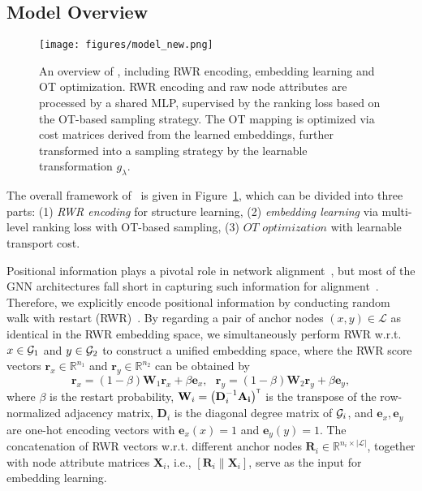 \vspace{-2pt}
\subsection{Model Overview}\label{subsec:overview}

\begin{figure}[t]
  \texttt{[image: figures/model\_new.png]}
  \caption{An overview of \algname, including RWR encoding, embedding learning and OT optimization. RWR encoding and raw node attributes are processed by a shared MLP, supervised by the ranking loss based on the OT-based sampling strategy. The OT mapping is optimized via cost matrices derived from the learned embeddings, further transformed into a sampling strategy by the learnable transformation $g_\lambda$.
  }
  \vspace{-10pt}
  \label{fig:model}
\end{figure}

The overall framework of \algname\ is given in Figure~\ref{fig:model}, which can be divided into three parts: (1) \textit{RWR encoding} for structure learning, (2) \textit{embedding learning} via multi-level ranking loss with OT-based sampling, (3) $\textit{OT optimization}$ with learnable transport cost.

Positional information plays a pivotal role in network alignment~\cite{bright,parrot}, but most of the GNN architectures fall short in capturing such information for alignment~\cite{you2019position}.
Therefore, we explicitly encode positional information by conducting random walk with restart (RWR)~\cite{tong2006fast}.
By regarding a pair of anchor nodes $(x, y)\in\mathcal{L}$ as identical in the RWR embedding space, we simultaneously perform RWR w.r.t. $x\in\mathcal{G}_1$ and $y\in\mathcal{G}_2$ to construct a unified embedding space, where the RWR score vectors $\mathbf{r}_x\in\mathbb{R}^{n_1}$ and $\mathbf{r}_y\in\mathbb{R}^{n_2}$ can be obtained by~\cite{tong2006fast,bright}
\begin{equation}\label{eq:rwr}
    \mathbf{r}_x = (1-\beta)\mathbf{W}_1\mathbf{r}_x + \beta\mathbf{e}_x,
    ~~~\mathbf{r}_y = (1-\beta)\mathbf{W}_2\mathbf{r}_y + \beta\mathbf{e}_y,
\end{equation}
where $\beta$ is the restart probability, $\mathbf{W}_i=\left(\mathbf{D}_i^{-1}\mathbf{A_i}\right)^{\scriptscriptstyle\mathsf{T}}$ is the transpose of the row-normalized adjacency matrix, $\mathbf{D}_i$ is the diagonal degree matrix of $\mathcal{G}_i$, and $\mathbf{e}_x,\mathbf{e}_y$ are one-hot encoding vectors with $\mathbf{e}_x(x)=1$ and $\mathbf{e}_y(y)=1$.
The concatenation of RWR vectors w.r.t. different anchor nodes $\mathbf{R}_i\in\mathbb{R}^{n_i\times|\mathcal{L}|}$, together with node attribute matrices $\mathbf{X}_i$, i.e., $[\mathbf{R}_i\|\mathbf{X}_i]$, serve as the input for embedding learning.

